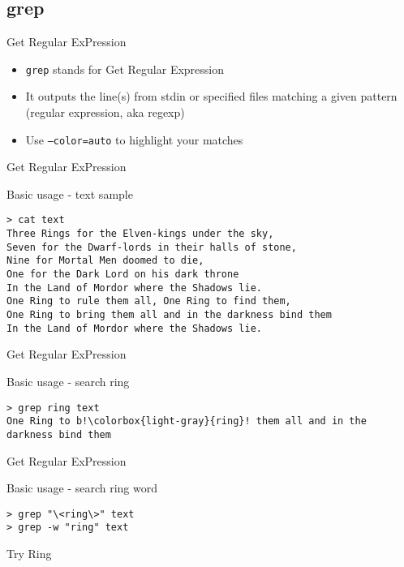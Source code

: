 \subsection{grep}
\begin{frame}[fragile]{Get Regular ExPression}
\begin{itemize}
  \item \texttt{grep} stands for Get Regular Expression
  \pause
  \item It outputs the line(s) from stdin or specified files matching a given pattern (regular expression, aka regexp)
  \pause
  \item Use \texttt{--color=auto} to highlight your matches
\end{itemize}
\end{frame}

\begin{frame}[fragile]{Get Regular ExPression}
  \begin{exampleblock}{Basic usage - text sample}
    \begin{lstlisting}[showstringspaces=false,basicstyle=\tiny]
> cat text
Three Rings for the Elven-kings under the sky,
Seven for the Dwarf-lords in their halls of stone,
Nine for Mortal Men doomed to die,
One for the Dark Lord on his dark throne
In the Land of Mordor where the Shadows lie.
One Ring to rule them all, One Ring to find them,
One Ring to bring them all and in the darkness bind them
In the Land of Mordor where the Shadows lie.
    \end{lstlisting}
  \end{exampleblock}
\end{frame}

\begin{frame}[fragile]{Get Regular ExPression}
  \begin{exampleblock}{Basic usage - search ring}
    \begin{lstlisting}[showstringspaces=false,basicstyle=\tiny,escapechar=!]
> grep ring text
One Ring to b!\colorbox{light-gray}{ring}! them all and in the darkness bind them
    \end{lstlisting}
  \end{exampleblock}
\end{frame}


\begin{frame}[fragile]{Get Regular ExPression}
  \begin{exampleblock}{Basic usage - search ring word}
    \begin{lstlisting}[showstringspaces=false,basicstyle=\tiny]
> grep "\<ring\>" text
> grep -w "ring" text
    \end{lstlisting}
  \end{exampleblock}
  \pause
  Try Ring
\end{frame}


